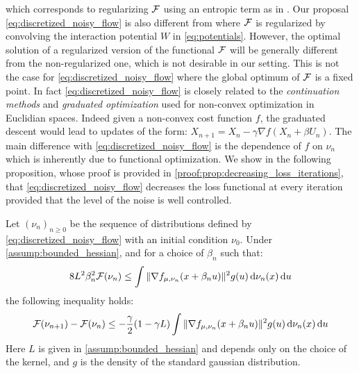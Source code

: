 which corresponds to regularizing ${{\mathcal F}}$ using an entropic term as in \cite{mei2018mean,Simsekli:2018}. Our proposal \cref{eq:discretized_noisy_flow} is also different from \cite{craig2016blob,carrillo2019blob} where ${{\mathcal F}}$ is regularized by convolving the interaction potential $W$ in \cref{eq:potentials}. However, the optimal solution of a regularized version of the functional ${{\mathcal F}}$ will be generally different from the non-regularized one, which is not desirable in our setting. This is not the case for \cref{eq:discretized_noisy_flow} where the global optimum of ${{\mathcal F}}$ is a fixed point.  
In fact \cref{eq:discretized_noisy_flow} is  closely related to the \textit{continuation methods} \cite{Gulcehre:2016a,Gulcehre:2016,Chaudhari:2017}  and \textit{graduated optimization} \cite{Hazan:2015} used for non-convex optimization in Euclidian spaces. Indeed given a non-convex cost function $f$, the graduated descent would lead to updates of the form: $X_{n+1} = X_n - \gamma \nabla f(X_n+\beta U_n )$. The main difference with \cref{eq:discretized_noisy_flow} is the dependence of $f$ on $\nu_n$ which is inherently due to functional optimization.
We show in the following proposition, whose proof is provided in \cref{proof:prop:decreasing_loss_iterations}, that \cref{eq:discretized_noisy_flow} decreases the loss functional at every iteration provided that the level of the noise is well controlled.
\begin{proposition}\label{prop:decreasing_loss_iterations}
	Let $(\nu_n)_{n\geq 0}$ be the sequence of distributions defined by \cref{eq:discretized_noisy_flow} with an initial condition $\nu_0$. Under \cref{assump:bounded_hessian}, and for a choice of $\beta_n$ such that:
	\begin{align}\label{eq:control_level_noise}
		8L^2\beta_n^2 {{\mathcal F}}(\nu_n) \leq \int \Vert \nabla f_{\mu,\nu_n}(x+\beta_n u) \Vert^2 g(u) \mathop{}\!\mathrm{d} \nu_n(x)\mathop{}\!\mathrm{d} u   
	\end{align}
	 the following inequality holds:
	\begin{align}\label{eq:decreasing_loss_iterations}
		{{\mathcal F}}(\nu_{n+1}) - {{\mathcal F}}(\nu_n  ) \leq -\frac{\gamma}{2}(1-\gamma L)\int \Vert \nabla f_{\mu,\nu_n}(x+\beta_n u) \Vert^2 g(u) \mathop{}\!\mathrm{d}\nu_n(x) \mathop{}\!\mathrm{d} u
	\end{align}
	Here $L$ is given in \cref{assump:bounded_hessian} and depends only on the choice of the kernel, and $g$ is the density of the standard gaussian distribution.
\end{proposition}


